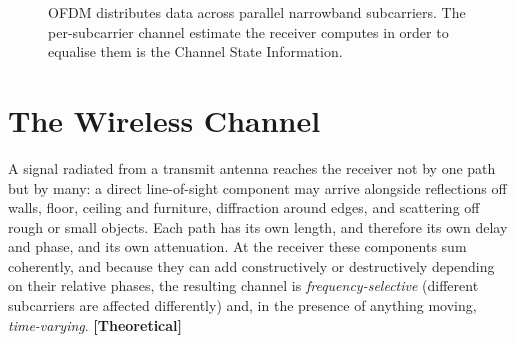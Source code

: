 \documentclass[11pt,a4paper,oneside]{report}
\newcommand{\evidencetag}[2]{{\small\sffamily\bfseries\textcolor{#1}{[#2]}}}
\newcommand{\Theo}{\evidencetag{warn}{Theoretical}}
\begin{document}
\begin{figure}[H]
\centering
{}
\caption[OFDM subcarrier structure and the origin of CSI]{OFDM distributes data
across parallel narrowband subcarriers. The per-subcarrier channel estimate the
receiver computes in order to equalise them is the Channel State Information.}
\label{fig:ofdm}
\end{figure}

\section{The Wireless Channel}

A signal radiated from a transmit antenna reaches the receiver not by one path
but by many: a direct line-of-sight component may arrive alongside reflections
off walls, floor, ceiling and furniture, diffraction around edges, and
scattering off rough or small objects. Each path has its own length, and
therefore its own delay and phase, and its own attenuation. At the receiver
these components sum coherently, and because they can add constructively or
destructively depending on their relative phases, the resulting channel is
\emph{frequency-selective} (different subcarriers are affected differently)
and, in the presence of anything moving, \emph{time-varying}. \Theo
\end{document}
